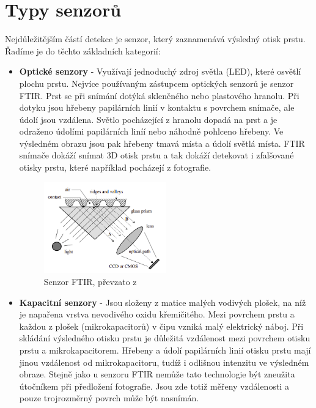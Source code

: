 \section{Typy senzorů}
Nejdůležitějším částí detekce je senzor, který zaznamenává výsledný otisk prstu. Řadíme je do těchto základních kategorií:
\begin{itemize}
\item \textbf{Optické senzory} - Využívají jednoduchý zdroj světla (LED), které osvětlí plochu prstu.\cite{Drahansky} Nejvíce používaným zástupcem optických senzorů je senzor FTIR. Prst se při snímání dotýká skleněného nebo plastového hranolu. Při dotyku jsou hřebeny papilárních linií v kontaktu s povrchem snímače, ale údolí jsou vzdálena. Světlo pocházející z hranolu dopadá na prst a je odraženo údolími papilárních liníí nebo náhodně pohlceno hřebeny. Ve výsledném obrazu jsou pak hřebeny tmavá místa a údolí světlá místa. FTIR snímače dokáží snímat 3D otisk prstu a tak dokáží detekovat i zfalšované otisky prstu, které například pocházejí z fotografie. \cite{Maltoni2009}

\begin{figure}[!htbp]
    \centering
    \includegraphics[width=200px]{obrazky-figures/ftiredit.png}
    \caption{Senzor FTIR, převzato z \cite{Maltoni2009}}
\end{figure}

\item \textbf{Kapacitní senzory} - Jsou složeny z matice malých vodivých plošek, na níž je napařena vrstva nevodivého oxidu křemičitého.\cite{Drahansky} Mezi povrchem prstu a každou z plošek (mikrokapacitorů) v čipu vzniká malý elektrický náboj. Při skládání výsledného otisku prstu je důležitá vzdálenost mezi povrchem otisku prstu a mikrokapacitorem. Hřebeny a údolí papilárních linií otisku prstu mají jinou vzdálenost od mikrokapacitoru, tudíž i odlišnou intenzitu ve výsledném obraze. Stejně jako u senzoru FTIR nemůže tato technologie být zneužita útočníkem při předložení fotografie. Jsou zde totiž měřeny vzdálenosti a pouze trojrozměrný povrch může být nasnímán.\cite{Maltoni2009}


\end{itemize}

